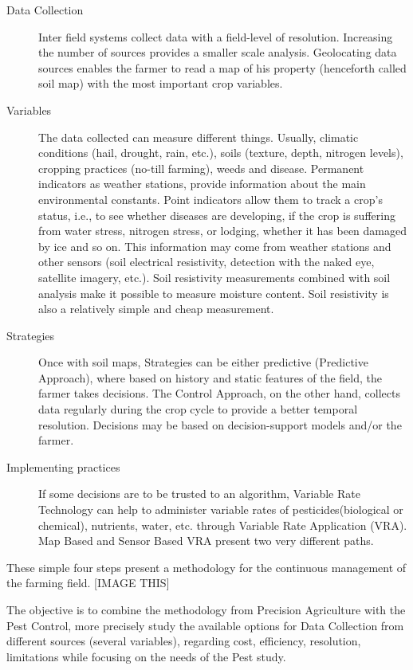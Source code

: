 \begin{description}
\item [Data Collection] Inter field systems collect data with a field-level of resolution. Increasing the number of sources provides a smaller scale analysis. Geolocating data sources enables the farmer to read a map of his property (henceforth called soil map) with the most important crop variables.
\item [Variables] The data collected can measure different things. Usually, climatic conditions (hail, drought, rain, etc.), soils (texture, depth, nitrogen levels), cropping practices (no-till farming), weeds and disease. Permanent indicators as weather stations, provide information about the main environmental constants. Point indicators allow them to track a crop’s status, i.e., to see whether diseases are developing, if the crop is suffering from water stress, nitrogen stress, or lodging, whether it has been damaged by ice and so on. This information may come from weather stations and other sensors (soil electrical resistivity, detection with the naked eye, satellite imagery, etc.). Soil resistivity measurements combined with soil analysis make it possible to measure moisture content. Soil resistivity is also a relatively simple and cheap measurement.
\item [Strategies] Once with soil maps, Strategies can be either predictive (Predictive Approach), where   based on history and static features of the field, the farmer takes decisions. The Control Approach, on the other hand, collects data regularly during the crop cycle to provide a better temporal resolution. Decisions may be based on decision-support models and/or the farmer.
\item [Implementing practices] If some decisions are to be trusted to an algorithm, Variable Rate Technology can help to administer variable rates of pesticides(biological or chemical), nutrients, water, etc. through Variable Rate Application (VRA). Map Based and Sensor Based VRA present two very different paths.
\end{description}	

These simple four steps present a methodology for the continuous management of the farming field. [IMAGE THIS]

The objective is to combine the methodology from Precision Agriculture with the Pest Control, more precisely study the available options for Data Collection from different sources (several variables), regarding cost, efficiency, resolution, limitations while focusing on the needs of the Pest study. 


